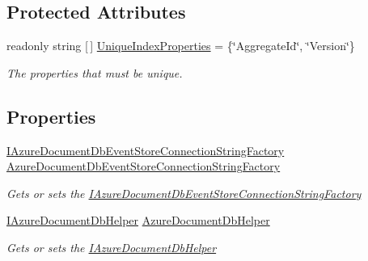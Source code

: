 \subsection*{Protected Attributes}
\begin{DoxyCompactItemize}
\item 
readonly string \mbox{[}$\,$\mbox{]} \hyperlink{classCqrs_1_1Azure_1_1DocumentDb_1_1Events_1_1AzureDocumentDbEventStore_ab2a2b5dd046487edc33917983587d847_ab2a2b5dd046487edc33917983587d847}{Unique\+Index\+Properties} = \{\char`\"{}Aggregate\+Id\char`\"{}, \char`\"{}Version\char`\"{}\}
\begin{DoxyCompactList}\small\item\em The properties that must be unique. \end{DoxyCompactList}\end{DoxyCompactItemize}
\subsection*{Properties}
\begin{DoxyCompactItemize}
\item 
\hyperlink{interfaceCqrs_1_1Azure_1_1DocumentDb_1_1Events_1_1IAzureDocumentDbEventStoreConnectionStringFactory}{I\+Azure\+Document\+Db\+Event\+Store\+Connection\+String\+Factory} \hyperlink{classCqrs_1_1Azure_1_1DocumentDb_1_1Events_1_1AzureDocumentDbEventStore_a5a651f82c71bf8bd51114a3dc63a87a6_a5a651f82c71bf8bd51114a3dc63a87a6}{Azure\+Document\+Db\+Event\+Store\+Connection\+String\+Factory}
\begin{DoxyCompactList}\small\item\em Gets or sets the \hyperlink{interfaceCqrs_1_1Azure_1_1DocumentDb_1_1Events_1_1IAzureDocumentDbEventStoreConnectionStringFactory}{I\+Azure\+Document\+Db\+Event\+Store\+Connection\+String\+Factory} \end{DoxyCompactList}\item 
\hyperlink{interfaceCqrs_1_1Azure_1_1DocumentDb_1_1IAzureDocumentDbHelper}{I\+Azure\+Document\+Db\+Helper} \hyperlink{classCqrs_1_1Azure_1_1DocumentDb_1_1Events_1_1AzureDocumentDbEventStore_a2029bdf083085da168d554c9922e9dfe_a2029bdf083085da168d554c9922e9dfe}{Azure\+Document\+Db\+Helper}
\begin{DoxyCompactList}\small\item\em Gets or sets the \hyperlink{interfaceCqrs_1_1Azure_1_1DocumentDb_1_1IAzureDocumentDbHelper}{I\+Azure\+Document\+Db\+Helper} \end{DoxyCompactList}\end{DoxyCompactItemize}


